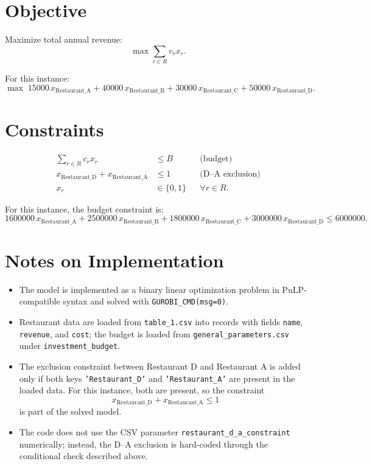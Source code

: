 \section*{Objective}

Maximize total annual revenue:
\[
\max \sum_{r \in R} v_r x_r.
\]

For this instance:
\[
\max\;
15000\,x_{\text{Restaurant\_A}}
+40000\,x_{\text{Restaurant\_B}}
+30000\,x_{\text{Restaurant\_C}}
+50000\,x_{\text{Restaurant\_D}}.
\]

\section*{Constraints}

\begin{align}
\sum_{r \in R} c_r x_r &\le B
&& \text{(budget)} \\
x_{\text{Restaurant\_D}} + x_{\text{Restaurant\_A}} &\le 1
&& \text{(D--A exclusion)} \\
x_r &\in \{0,1\}
&& \forall r \in R.
\end{align}

For this instance, the budget constraint is:
\[
1600000\,x_{\text{Restaurant\_A}}
+2500000\,x_{\text{Restaurant\_B}}
+1800000\,x_{\text{Restaurant\_C}}
+3000000\,x_{\text{Restaurant\_D}}
\le 6000000.
\]

\section*{Notes on Implementation}

\begin{itemize}
    \item The model is implemented as a binary linear optimization problem in PuLP-compatible syntax and solved with \texttt{GUROBI\_CMD(msg=0)}.
    \item Restaurant data are loaded from \texttt{table\_1.csv} into records with fields \texttt{name}, \texttt{revenue}, and \texttt{cost}; the budget is loaded from \texttt{general\_parameters.csv} under \texttt{investment\_budget}.
    \item The exclusion constraint between Restaurant D and Restaurant A is added only if both keys \texttt{'Restaurant\_D'} and \texttt{'Restaurant\_A'} are present in the loaded data. For this instance, both are present, so the constraint
    \[
    x_{\text{Restaurant\_D}} + x_{\text{Restaurant\_A}} \le 1
    \]
    is part of the solved model.
    \item The code does not use the CSV parameter \texttt{restaurant\_d\_a\_constraint} numerically; instead, the D--A exclusion is hard-coded through the conditional check described above.
\end{itemize}
